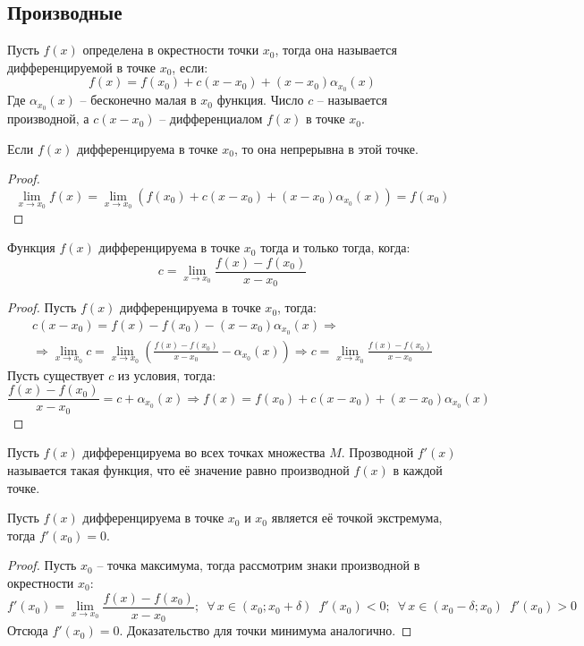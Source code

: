 \documentclass[12pt]{article}
\begin{document}
\subsection{Производные}

\begin{definition}
    Пусть $f(x)$ определена в окрестности точки $x_0$, тогда она называется дифференцируемой в точке $x_0$, если:
    $$f(x)=f(x_0)+c(x-x_0)+(x-x_0)\alpha_{x_0}(x)$$
    Где $\alpha_{x_0}(x)$ -- бесконечно малая в $x_0$ функция. Число $c$ -- называется производной, а $c(x-x_0)$ -- дифференциалом $f(x)$ в точке $x_0$.
\end{definition}
\begin{statement}
    Если $f(x)$ дифференцируема в точке $x_0$, то она непрерывна в этой точке.
\end{statement}
\begin{proof}
    $$\lim_{x\to x_0}f(x)=\lim_{x\to x_0}\left(f(x_0)+c(x-x_0)+(x-x_0)\alpha_{x_0}(x)\right)=f(x_0)$$
\end{proof}
\begin{statement}
    Функция $f(x)$ дифференцируема в точке $x_0$ тогда и только тогда, когда:
    $$c=\lim_{x\to x_0}\frac{f(x)-f(x_0)}{x-x_0}$$
\end{statement}
\begin{proof}
    Пусть $f(x)$ дифференцируема в точке $x_0$, тогда:
    \begin{multline*}
        c(x-x_0)=f(x)-f(x_0)-(x-x_0)\alpha_{x_0}(x)\Longrightarrow\\ \Longrightarrow \lim_{x\to x_0} c=\lim_{x\to x_0}\left(\frac{f(x)-f(x_0)}{x-x_0}-\alpha_{x_0}(x)\right)\Longrightarrow c=\lim_{x\to x_0}\frac{f(x)-f(x_0)}{x-x_0}
    \end{multline*}
    Пусть существует $c$ из условия, тогда:
    $$\frac{f(x)-f(x_0)}{x-x_0}=c+\alpha_{x_0}(x)\Longrightarrow f(x)=f(x_0)+c(x-x_0)+(x-x_0)\alpha_{x_0}(x)$$
\end{proof}
\begin{definition}
    Пусть $f(x)$ дифференцируема во всех точках множества $M$. Прозводной $f'(x)$ называется такая функция, что её значение равно производной $f(x)$ в каждой точке.
\end{definition}
\begin{theorem}[Ферма]
    Пусть $f(x)$ дифференцируема в точке $x_0$ и $x_0$ является её точкой экстремума, тогда $f'(x_0)=0$.
\end{theorem}
\begin{proof}
    Пусть $x_0$ -- точка максимума, тогда рассмотрим знаки производной в окрестности $x_0$:
    $$f'(x_0)=\lim_{x\to x_0}\frac{f(x)-f(x_0)}{x-x_0};\enspace \forall\,x\in(x_0;x_0+\delta)\enspace f'(x_0)<0;\enspace \forall\,x\in(x_0-\delta;x_0)\enspace f'(x_0)>0$$
    Отсюда $f'(x_0)=0$. Доказательство для точки минимума аналогично.
\end{proof}
\end{document}
